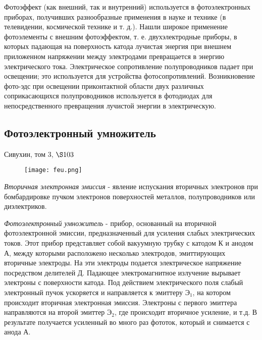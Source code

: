 Фотоэффект (как внешний, так и внутренний) используется в фотоэлектронных приборах, получивших разнообразные применения в науке и технике (в телевидении, космической технике и т. д.). Нашли широкое применение фотоэлементы с внешним фотоэффектом, т. е. двухэлектродные приборы, в которых падающая на поверхность катода лучистая энергия при внешнем приложенном напряжении между электродами превращается в энергию электрического тока. Электрическое сопротивление полупроводников падает при освещении; это используется для устройства фотосопротивлений. Возникновение фото-эдс при освещении приконтактной области двух различных соприкасающихся полупроводников используется в фотодиодах для непосредственного превращения лучистой энергии в электрическую. 

\subsection{Фотоэлектронный умножитель}

Сивухин, том 3, $\S 103$
\begin{figure}[h!]
    \centering
    \texttt{[image: feu.png]}
    \label{fig:my_label}
\end{figure} 

\textit{Вторичная электронная эмиссия} - явление испускания вторичных электронов при бомбардировке пучком электронов поверхностей металлов, полупроводников или диэлектриков.

\textit{Фотоэлектронный умножитель} - прибор, основанный на вторичной фотоэлектронной эмиссии, предназначенный для усиления слабых электрических токов. Этот прибор представляет собой вакуумную трубку с катодом К и анодом А, между которыми расположено несколько электродов, эмиттирующих вторичные электроды. На эти электроды подается электрическое напряжение посредством делителей Д. Падающее электромагнитное излучение вырывает электроны с поверхности катода. Под действием электрического поля слабый электронный пучок ускоряется и направляется к эмиттеру Э$_1$, на котором происходит вторичная электронная эмиссия. Электроны с первого эмиттера направляются на второй эмиттер Э$_2$, где происходит вторичное усиление, и т.д. В результате получается усиленный во много раз фототок, который и снимается с анода А.

